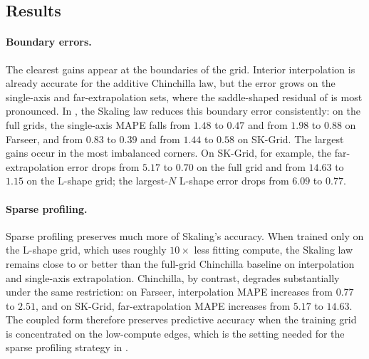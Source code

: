 \documentclass[]{fairmeta}
\newcommand{\ska}{Skaling}
\begin{document}
\subsection{Results}

\paragraph{Boundary errors.}
The clearest gains appear at the boundaries of the grid. Interior interpolation is already accurate for the additive Chinchilla law, but the error grows on the single-axis and far-extrapolation sets, where the saddle-shaped residual of  is most pronounced. In , the \ska{} law reduces this boundary error consistently: on the full grids, the single-axis MAPE falls from $1.48$ to $0.47$ and from $1.98$ to $0.88$ on Farseer, and from $0.83$ to $0.39$ and from $1.44$ to $0.58$ on SK-Grid. The largest gains occur in the most imbalanced corners. On SK-Grid, for example, the far-extrapolation error drops from $5.17$ to $0.70$ on the full grid and from $14.63$ to $1.15$ on the L-shape grid; the largest-$N$ L-shape error drops from $6.09$ to $0.77$.

\paragraph{Sparse profiling.}
Sparse profiling preserves much more of \ska{}'s accuracy. When trained only on the L-shape grid, which uses roughly $10\times$ less fitting compute, the \ska{} law remains close to or better than the full-grid Chinchilla baseline on interpolation and single-axis extrapolation. Chinchilla, by contrast, degrades substantially under the same restriction: on Farseer, interpolation MAPE increases from $0.77$ to $2.51$, and on SK-Grid, far-extrapolation MAPE increases from $5.17$ to $14.63$. The coupled form therefore preserves predictive accuracy when the training grid is concentrated on the low-compute edges, which is the setting needed for the sparse profiling strategy in .
\end{document}
